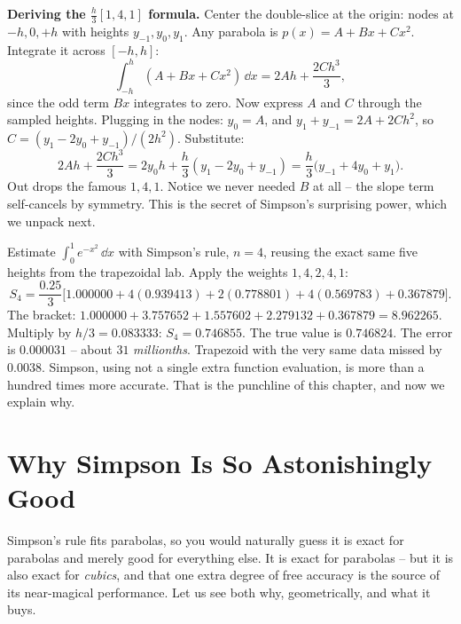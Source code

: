 \begin{whybox}
\textbf{Deriving the $\tfrac{h}{3}[1,4,1]$ formula.} Center the double-slice at the origin: nodes at $-h, 0, +h$ with heights $y_{-1}, y_0, y_1$. Any parabola is $p(x) = A + Bx + Cx^2$. Integrate it across $[-h,h]$:
\[
\int_{-h}^{h} (A + Bx + Cx^2)\,\dd x = 2Ah + \frac{2Ch^3}{3},
\]
since the odd term $Bx$ integrates to zero. Now express $A$ and $C$ through the sampled heights. Plugging in the nodes: $y_0 = A$, and $y_1 + y_{-1} = 2A + 2Ch^2$, so $C = (y_1 - 2y_0 + y_{-1})/(2h^2)$. Substitute:
\[
2Ah + \frac{2Ch^3}{3} = 2y_0 h + \frac{h}{3}(y_1 - 2y_0 + y_{-1}) = \frac{h}{3}\big(y_{-1} + 4y_0 + y_1\big).
\]
Out drops the famous $1,4,1$. Notice we never needed $B$ at all -- the slope term self-cancels by symmetry. This is the secret of Simpson's surprising power, which we unpack next.
\end{whybox}

\begin{labbox}
Estimate $\int_0^1 e^{-x^2}\,\dd x$ with Simpson's rule, $n = 4$, reusing the exact same five heights from the trapezoidal lab. Apply the weights $1,4,2,4,1$:
\[
S_4 = \frac{0.25}{3}\Big[1.000000 + 4(0.939413) + 2(0.778801) + 4(0.569783) + 0.367879\Big].
\]
The bracket: $1.000000 + 3.757652 + 1.557602 + 2.279132 + 0.367879 = 8.962265$. Multiply by $h/3 = 0.083333$: $S_4 = 0.746855$. The true value is $0.746824$. The error is $0.000031$ -- about $31$ \emph{millionths}. Trapezoid with the very same data missed by $0.0038$. Simpson, using not a single extra function evaluation, is more than a hundred times more accurate. That is the punchline of this chapter, and now we explain why.
\end{labbox}

\section{Why Simpson Is So Astonishingly Good}
\label{ch27:whysimpson}

Simpson's rule fits parabolas, so you would naturally guess it is exact for parabolas and merely good for everything else. It is exact for parabolas -- but it is also exact for \emph{cubics}, and that one extra degree of free accuracy is the source of its near-magical performance. Let us see both why, geometrically, and what it buys.

